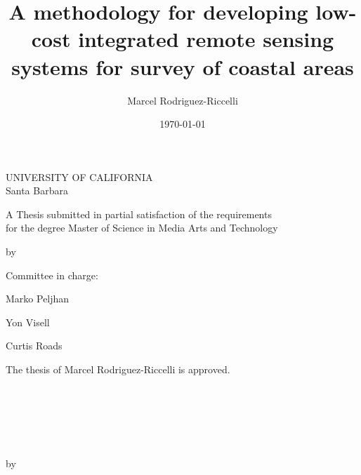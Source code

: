 \documentclass{article}
\title{A methodology for developing low-cost integrated remote sensing systems for survey of coastal areas}
\author{Marcel Rodriguez-Riccelli}
\date{\today}
\begin{document}
\begin{center}
\thispagestyle{empty}
\par{UNIVERSITY OF CALIFORNIA \\[.5cm] Santa Barbara} 
\vspace{1.25cm}
\par{\huge \thetitle}
\vspace{1.5cm}
\par{A Thesis submitted in partial satisfaction of the requirements \\ for the degree Master of Science in Media Arts and Technology}
\vspace{1cm}
{by \par}
\vspace{1cm}
{\theauthor}
\vspace{1.5cm}
\par{Committee in charge:}
\vspace{1cm}
\par{Marko Peljhan}
\vspace{1cm}
\par{Yon Visell}
\vspace{1cm}
\par{Curtis Roads}
\vspace{2cm}
\par{\thedate}
\end{center}

\newpage
\thispagestyle{empty}
\begin{center}
\par{The thesis of Marcel Rodriguez-Riccelli is approved.}
\vspace{2cm}
\par{\makebox[10cm][l]{\rule{10cm}{0.4pt}}\\
}
\vspace{1cm}
\par{\makebox[10cm][l]{\rule{10cm}{0.4pt}}\\
}
\vspace{1cm}
\par{\makebox[10cm][l]{\rule{10cm}{0.4pt}}\\
}
\vspace{2cm}
\par{\thedate}
\end{center}

\newpage
{}
\thispagestyle{fancy}
\begin{center}
\par{\thetitle}
\vspace{.5cm}
{by \par}
\vspace{.5cm}
\par{\theauthor}
\vspace{.5cm}
\end{center}
\doublespacing
\end{document}
